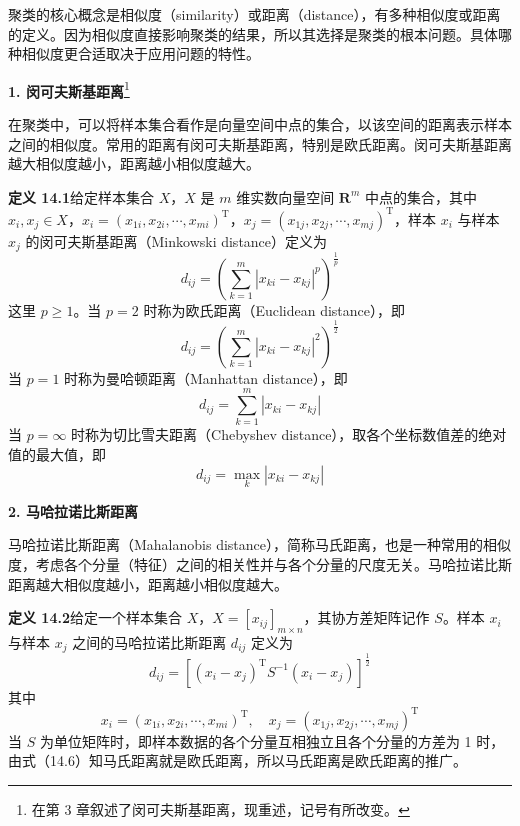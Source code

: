 \documentclass[UTF8,12pt,a4paper,fontset=fandol]{ctexart}
\begin{document}
聚类的核心概念是相似度（similarity）或距离（distance），有多种相似度或距离的定义。因为相似度直接影响聚类的结果，所以其选择是聚类的根本问题。具体哪种相似度更合适取决于应用问题的特性。

\noindent\textbf{1. 闵可夫斯基距离}\footnote{在第 3 章叙述了闵可夫斯基距离，现重述，记号有所改变。}

在聚类中，可以将样本集合看作是向量空间中点的集合，以该空间的距离表示样本之间的相似度。常用的距离有闵可夫斯基距离，特别是欧氏距离。闵可夫斯基距离越大相似度越小，距离越小相似度越大。

\noindent\textbf{定义 14.1}\quad 给定样本集合 $X$，$X$ 是 $m$ 维实数向量空间 $\mathbf{R}^m$ 中点的集合，其中 $x_i,x_j\in X$，$x_i=(x_{1i},x_{2i},\cdots,x_{mi})^{\mathrm{T}}$，$x_j=(x_{1j},x_{2j},\cdots,x_{mj})^{\mathrm{T}}$，样本 $x_i$ 与样本 $x_j$ 的闵可夫斯基距离（Minkowski distance）定义为
\begin{equation}
d_{ij}=\left(\sum_{k=1}^m |x_{ki}-x_{kj}|^p\right)^{\frac{1}{p}}
\tag{14.2}
\end{equation}
这里 $p\geqslant 1$。当 $p=2$ 时称为欧氏距离（Euclidean distance），即
\begin{equation}
d_{ij}=\left(\sum_{k=1}^m |x_{ki}-x_{kj}|^2\right)^{\frac{1}{2}}
\tag{14.3}
\end{equation}
当 $p=1$ 时称为曼哈顿距离（Manhattan distance），即
\begin{equation}
d_{ij}=\sum_{k=1}^m |x_{ki}-x_{kj}|
\tag{14.4}
\end{equation}
当 $p=\infty$ 时称为切比雪夫距离（Chebyshev distance），取各个坐标数值差的绝对值的最大值，即
\begin{equation}
d_{ij}=\max_k |x_{ki}-x_{kj}|
\tag{14.5}
\end{equation}

\noindent\textbf{2. 马哈拉诺比斯距离}

马哈拉诺比斯距离（Mahalanobis distance），简称马氏距离，也是一种常用的相似度，考虑各个分量（特征）之间的相关性并与各个分量的尺度无关。马哈拉诺比斯距离越大相似度越小，距离越小相似度越大。

\noindent\textbf{定义 14.2}\quad 给定一个样本集合 $X$，$X=[x_{ij}]_{m\times n}$，其协方差矩阵记作 $S$。样本 $x_i$ 与样本 $x_j$ 之间的马哈拉诺比斯距离 $d_{ij}$ 定义为
\begin{equation}
d_{ij}=\left[(x_i-x_j)^{\mathrm{T}}S^{-1}(x_i-x_j)\right]^{\frac{1}{2}}
\tag{14.6}
\end{equation}
其中
\begin{equation}
x_i=(x_{1i},x_{2i},\cdots,x_{mi})^{\mathrm{T}},\quad
x_j=(x_{1j},x_{2j},\cdots,x_{mj})^{\mathrm{T}}
\tag{14.7}
\end{equation}
当 $S$ 为单位矩阵时，即样本数据的各个分量互相独立且各个分量的方差为 1 时，由式（14.6）知马氏距离就是欧氏距离，所以马氏距离是欧氏距离的推广。
\end{document}
